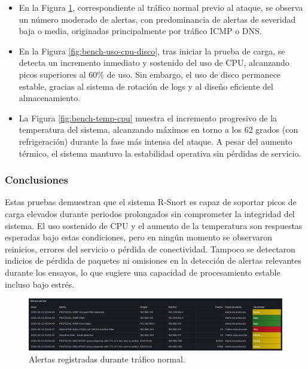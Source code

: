 \documentclass[11pt,a4paper,twoside]{report}
\begin{document}
\begin{itemize}
	\item En la Figura \ref{fig:bench-alertas-normales}, correspondiente al tráfico normal previo al ataque, se observa un número moderado de alertas, con predominancia de alertas de severidad baja o media, originadas principalmente por tráfico ICMP o DNS.
	
	\item En la Figura \ref{fig:bench-uso-cpu-disco}, tras iniciar la prueba de carga, se detecta un incremento inmediato y sostenido del uso de CPU, alcanzando picos superiores al 60\% de uso. Sin embargo, el uso de disco permanece estable, gracias al sistema de rotación de logs y al diseño eficiente del almacenamiento.
	
	\item La Figura \ref{fig:bench-temp-cpu} muestra el incremento progresivo de la temperatura del sistema, alcanzando máximos en torno a los 62 grados (con refrigeración) durante la fase más intensa del ataque. A pesar del aumento térmico, el sistema mantuvo la estabilidad operativa sin pérdidas de servicio.
	
\end{itemize}

\subsubsection*{Conclusiones}
Estas pruebas demuestran que el sistema R-Snort es capaz de soportar picos de carga elevados durante periodos prolongados sin comprometer la integridad del sistema. El uso sostenido de CPU y el aumento de la temperatura son respuestas esperadas bajo estas condiciones, pero en ningún momento se observaron reinicios, errores del servicio o pérdida de conectividad. Tampoco se detectaron indicios de pérdida de paquetes ni omisiones en la detección de alertas relevantes durante los ensayos, lo que sugiere una capacidad de procesamiento estable incluso bajo estrés.


\begin{figure}[H]
	\centering
	\includegraphics[width=\textwidth]{benchmark/3.png}
	\caption{Alertas registradas durante tráfico normal.}
	\label{fig:bench-alertas-normales}
\end{figure}
\end{document}
